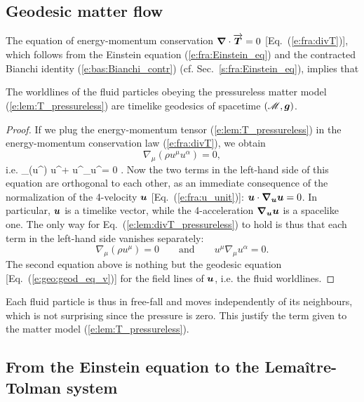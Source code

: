 \subsection{Geodesic matter flow}

The equation of energy-momentum conservation $\bm{\nabla}\cdot\overrightarrow{\bm{T}} = 0$
[Eq.~(\ref{e:fra:divT})], which
follows from the Einstein equation (\ref{e:fra:Einstein_eq}) and the contracted
Bianchi identity (\ref{e:bas:Bianchi_contr}) (cf. Sec.~\ref{s:fra:Einstein_eq}),
implies that
\begin{greybox}
The worldlines of the fluid particles obeying the pressureless matter
model (\ref{e:lem:T_pressureless}) are timelike geodesics of
spacetime $(\mathscr{M},\bm{g})$.
\end{greybox}
\begin{proof}
If we plug the energy-momentum tensor (\ref{e:lem:T_pressureless}) in the
energy-momentum conservation law (\ref{e:fra:divT}), we obtain
\[
    \nabla_\mu (\rho u^\mu u^\alpha )  = 0 ,
\]
i.e.
\be \label{e:lem:divT_pressureless}
    \nabla_\mu (\rho u^\mu) u^\alpha + \rho u^\mu \nabla_\mu u^\alpha = 0 .
\ee
Now the two terms in the left-hand side of this equation are orthogonal
to each other, as an immediate consequence of the normalization of the
4-velocity $\bm{u}$ [Eq.~(\ref{e:fra:u_unit})]:
$\bm{u}\cdot \bm{\nabla}_{\bm{u}}\bm{u} = 0$. In particular, $\bm{u}$
is a timelike vector, while the 4-acceleration $\bm{\nabla}_{\bm{u}}\bm{u}$
is a spacelike one. The only way for Eq.~(\ref{e:lem:divT_pressureless})
to hold is thus that each term
in the left-hand side vanishes separately:
\[
    \nabla_\mu (\rho u^\mu) = 0 \qquad\mbox{and}\qquad u^\mu \nabla_\mu u^\alpha = 0 .
\]
The second equation above is nothing but the geodesic equation [Eq.~(\ref{e:geo:geod_eq_v})]
for the field lines of $\bm{u}$, i.e. the fluid worldlines.
\end{proof}
Each fluid particle is thus in free-fall and moves independently of its
neighbours, which is not surprising since the pressure is zero.
This justify the term  given to the matter
model (\ref{e:lem:T_pressureless}).

\subsection{From the Einstein equation to the Lemaître-Tolman system}

